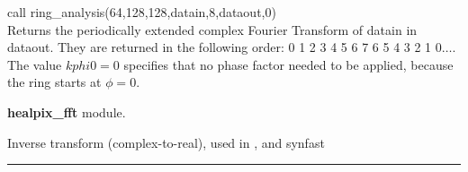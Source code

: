 \begin{example}
{
call ring\_analysis(64,128,128,datain,8,dataout,0)  \\
}
{
Returns the periodically extended complex 
Fourier Transform of datain in
dataout. They are returned in the following order: 0 1 2 3 4 5 6 7
6 5 4 3 2 1 $0\dots$. The value $kphi0=0$ specifies that no phase
factor needed to be applied, because the ring starts at $\phi=0$.
}
\end{example}

\begin{modules}
  \begin{sulist}{} %
  \item[\textbf{healpix\_fft}] module.
  \end{sulist}
\end{modules}

\begin{related}
  \begin{sulist}{} %
  \item[\htmlref{ring\_synthesis}{sub:ring_synthesis}] Inverse transform (complex-to-real), used in
  ,
   and synfast
  \end{sulist}
\end{related}

\rule{\hsize}{2mm}

\newpage
